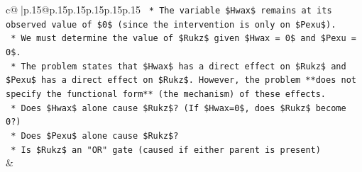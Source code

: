\documentclass{article}
\begin{document}
{\begin{supertabular}{c@{$\;$}|p{.15\linewidth}@{}p{.15\linewidth}p{.15\linewidth}p{.15\linewidth}p{.15\linewidth}p{.15\linewidth}}
{{{\texttt{    *   The variable \$Hwax\$ remains at its observed value of \$0\$ (since the intervention is only on \$Pexu\$).} \\
\texttt{    *   We must determine the value of \$Rukz\$ given \$Hwax = 0\$ and \$Pexu = 0\$.} \\
\texttt{    *   The problem states that \$Hwax\$ has a direct effect on \$Rukz\$ and \$Pexu\$ has a direct effect on \$Rukz\$. However, the problem **does not specify the functional form** (the mechanism) of these effects.} \\
\texttt{        *   Does \$Hwax\$ alone cause \$Rukz\$? (If \$Hwax=0\$, does \$Rukz\$ become 0?)} \\
\texttt{        *   Does \$Pexu\$ alone cause \$Rukz\$?} \\
\texttt{        *   Is \$Rukz\$ an "OR" gate (caused if either parent is present)} \\
            }
        }
    }
    & \\ \\


\end{supertabular}}
\end{document}
